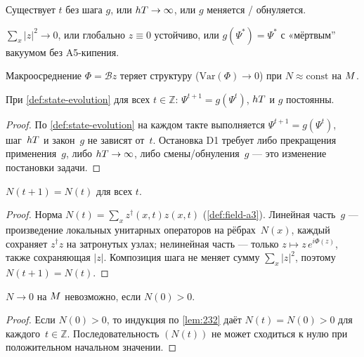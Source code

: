 \begin{definition}[Останов · D1]
\label{def:D1}
Существует $t$ без шага $g$, или $hT\to\infty$, или $g$ меняется / обнуляется.
\end{definition}

\begin{definition}
\label{def:D2}
$\sum_x|z|^2\to 0$, или глобально $z\equiv 0$ устойчиво, или $g(\Psi^*)=\Psi^*$ с «мёртвым'' вакуумом без A5-кипения.
\end{definition}

\begin{definition}
\label{def:D3}
Макроосреднение $\Phi=\mathcal{B}z$ теряет структуру ($\mathrm{Var}(\Phi)\to 0$) при $N\approx\mathrm{const}$ на $M$.
\end{definition}

\begin{lemma}
\label{lem:231}
При \cref{def:state-evolution} для всех $t\in\mathbb{Z}$: $\Psi^{t+1}=g(\Psi^t)$, $hT$ и $g$ постоянны.
\end{lemma}

\begin{proof}
По \cref{def:state-evolution} на каждом такте выполняется $\Psi^{t+1}=g(\Psi^t)$,
шаг~$hT$ и закон~$g$ не зависят от~$t$.
Остановка D1 требует либо прекращения применения~$g$, либо $hT\to\infty$,
либо смены/обнуления~$g$ --- это изменение постановки задачи.
\end{proof}

\begin{lemma}
\label{lem:232}
$N(t+1)=N(t)$ для всех $t$.
\end{lemma}

\begin{proof}
Норма $N(t)=\sum_x z^\dagger(x,t)z(x,t)$ (\cref{def:field-a3}).
Линейная часть~$g$ --- произведение локальных унитарных операторов
на рёбрах~$N(x)$, каждый сохраняет $z^\dagger z$ на затронутых узлах;
нелинейная часть --- только $z\mapsto z\,e^{i\Phi(z)}$, также сохраняющая $|z|$.
Композиция шага не меняет сумму $\sum_x|z|^2$, поэтому $N(t+1)=N(t)$.
\end{proof}

\begin{corollary}
\label{cor:232a}
$N\to 0$ на $M$ невозможно, если $N(0)>0$.
\end{corollary}

\begin{proof}
Если $N(0)>0$, то индукция по \cref{lem:232} даёт $N(t)=N(0)>0$ для каждого~$t\in\mathbb{Z}$.
Последовательность $(N(t))$ не может сходиться к нулю при положительном начальном значении.
\end{proof}

